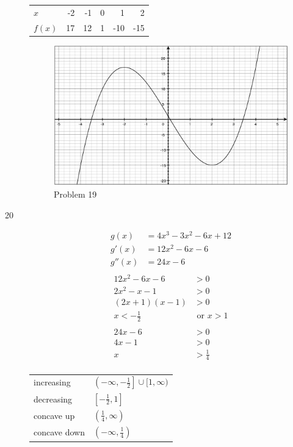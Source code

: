 \documentclass[fleqn]{exam}
\begin{document}
\begin{description}
\begin{tabular}{lrrrrr}
\toprule
$x$    & -2 & -1  & 0 &   1 &   2 \\
$f(x)$ & 17 & 12  & 1 & -10 & -15 \\
\bottomrule
\end{tabular}

\begin{figure}[H]
  \centering
  \includegraphics[scale=.3]{problem_19.eps}
  \caption*{Problem 19}
\end{figure}

\item[20]
\begin{align*}
  g(x)    &= 4x^3 - 3x^2 - 6x + 12 \\
  g'(x)   &= 12x^2 - 6x - 6 \\
  g''(x)  &= 24x - 6 \\
\end{align*}
\begin{align*}
  12x^2 - 6x - 6 &> 0 \\
  2x^2 - x - 1 &> 0 \\
  (2x + 1)(x - 1) &> 0 \\
  x < -\frac{1}{2} & \text{ or } x > 1 \\
\\
  24x - 6 &> 0 \\
  4x - 1 &> 0 \\
  x &> \frac{1}{4} \\
\end{align*}

\begin{tabular}{ll}
\toprule
increasing & $\left(-\infty, -\frac{1}{2} \right] \cup [1, \infty)$ \\
decreasing & $\left[ -\frac{1}{2}, 1 \right]$ \\
\midrule
concave up   & $\left(\frac{1}{4}, \infty \right)$ \\
concave down & $\left(-\infty, \frac{1}{4} \right)$ \\
\bottomrule
\end{tabular}


\end{description}
\end{document}
